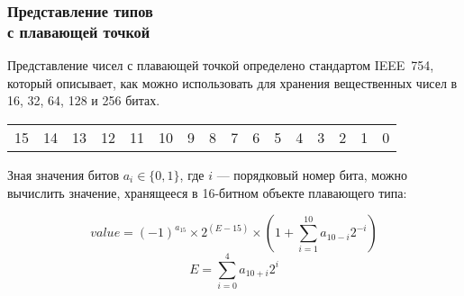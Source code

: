\documentclass[compress, 8pt]{beamer}
\newenvironment{sixteenbit}{%
    \begin{center}
        \begin{tabular}{ |m{0.2cm}|m{0.2cm}|m{0.2cm}|m{0.2cm}|m{0.2cm}|m{0.2cm}|m{0.2cm}|m{0.2cm}|m{0.2cm}|m{0.2cm}|m{0.2cm}|m{0.2cm}|m{0.2cm}|m{0.2cm}|m{0.2cm}|m{0.2cm}|  }
            \hline
}{
        \hline
        \multicolumn{1}{c}{\color{gray}\tiny{15}} &
        \multicolumn{1}{c}{\color{gray}\tiny{14}} &
        \multicolumn{1}{c}{\color{gray}\tiny{13}} &
        \multicolumn{1}{c}{\color{gray}\tiny{12}} &
        \multicolumn{1}{c}{\color{gray}\tiny{11}} &
        \multicolumn{1}{c}{\color{gray}\tiny{10}} &
        \multicolumn{1}{c}{\color{gray}\tiny{9}} &
        \multicolumn{1}{c}{\color{gray}\tiny{8}} &
        \multicolumn{1}{c}{\color{gray}\tiny{7}} &
        \multicolumn{1}{c}{\color{gray}\tiny{6}} &
        \multicolumn{1}{c}{\color{gray}\tiny{5}} &
        \multicolumn{1}{c}{\color{gray}\tiny{4}} &
        \multicolumn{1}{c}{\color{gray}\tiny{3}} &
        \multicolumn{1}{c}{\color{gray}\tiny{2}} &
        \multicolumn{1}{c}{\color{gray}\tiny{1}} &
        \multicolumn{1}{c}{\color{gray}\tiny{0}} \\
        \end{tabular}
    \end{center}
}
\begin{document}
\begin{frame}[fragile]

    \frametitle{Представление типов \\ с плавающей точкой}

    Представление чисел с плавающей точкой определено стандартом
    IEEE~754, который описывает, как можно использовать для хранения
    вещественных чисел в 16, 32, 64, 128 и 256 битах.

    \hfill\break

    \begin{sixteenbit}
        \cellcolor{blue!40!white}{} &
        \cellcolor{green!40!white}{} &
        \cellcolor{green!40!white}{} &
        \cellcolor{green!40!white}{} &
        \cellcolor{green!40!white}{} &
        \cellcolor{green!40!white}{} &
        \cellcolor{red!40!white}{} &
        \cellcolor{red!40!white}{} &
        \cellcolor{red!40!white}{} &
        \cellcolor{red!40!white}{} &
        \cellcolor{red!40!white}{} &
        \cellcolor{red!40!white}{} &
        \cellcolor{red!40!white}{} &
        \cellcolor{red!40!white}{} &
        \cellcolor{red!40!white}{} &
        \cellcolor{red!40!white}{} \\
    \end{sixteenbit}

    Зная значения битов $a_i \in \{0,1\}$, где $i$ ---
    порядковый номер бита, можно вычислить значение, хранящееся
    в 16-битном объекте плавающего типа:

    \begin{displaymath}
        value = (-1)^{a_{15}} \times 2^{(E-15)}
            \times (1 + \sum_{i=1}^{10} a_{10-i} 2^{-i})
    \end{displaymath}
    \begin{displaymath}
        E = \sum_{i=0}^{4} a_{10+i} 2^i
    \end{displaymath}

\end{frame}
\end{document}
